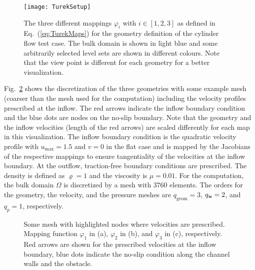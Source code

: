 \documentclass[12pt, twoside, english]{article}
\numberwithin{equation}{section}
\newcommand{\vek}[1]{\mathchoice{\displaystyle\boldsymbol#1}
{\textstyle\boldsymbol#1}{\scriptstyle\boldsymbol#1}
{\scriptscriptstyle\boldsymbol#1}}
\begin{document}
\begin{figure}
	\centering
	
	\texttt{[image: TurekSetup]}
	
	\caption{\label{fig:TurekMaps} The three different mappings $\varphi_i$ with $i \in [1,2,3]$ as defined in Eq.~(\ref{eq:TurekMaps}) for the geometry definition of the cylinder flow test case. The bulk domain is shown in light blue and some arbitrarily selected level sets are shown in different colours. Note that the view point is different for each geometry for a better visualization.}
\end{figure}

Fig.~\ref{fig:TurekMeshBCs} shows the discretization of the three geometries with some example mesh (coarser than the mesh used for the computation) including the velocity profiles prescribed at the inflow. The red arrows indicate the inflow boundary condition and the blue dots are nodes on the no-slip boundary. Note that the geometry and the inflow velocities (length of the red arrows) are scaled differently for each map in this visualization. The inflow boundary condition is the quadratic velocity profile with $u_{\mathrm{max}} = 1.5$ and $v=0$ in the flat case and is mapped by the Jacobians of the respective mappings to ensure tangentiality of the velocities at the inflow boundary. At the outflow, traction-free boundary conditions are prescribed. The density is defined as $\varrho = 1$ and the viscosity is $\mu = 0.01$. For the computation, the bulk domain $\Omega$ is discretized by a mesh with 3760 elements. The orders for the geometry, the velocity, and the pressure meshes are $q_{\mathrm{geom}} = 3$, $q_{\vek{u}} = 2$, and $q_{p} = 1$, respectively.

\begin{figure}
	\centering
	
	\hspace{0.5cm}
	\hspace{0.8cm}
	
	\caption{\label{fig:TurekMeshBCs} Some mesh with highlighted nodes where velocities are prescribed. Mapping function $\varphi_1$ in (a), $\varphi_2$ in (b), and $\varphi_3$ in (c), respectively. Red arrows are shown for the prescribed velocities at the inflow boundary, blue dots indicate the no-slip condition along the channel walls and the obstacle.}
\end{figure}
\end{document}
